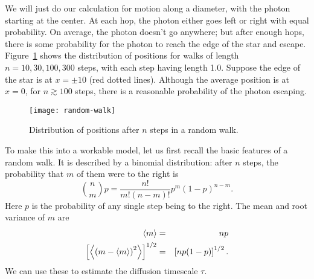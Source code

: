 We will just do our calculation for motion along a diameter, with the photon starting at the center. At each hop, the photon either goes left or right with equal probability. On average, the photon doesn't go anywhere; but after enough hops, there is some probability for the photon to reach the edge of the star and escape. Figure~\ref{f.random-walk} shows the distribution of positions for walks of length $n = 10, 30, 100, 300$ steps, with each step having length 1.0. Suppose the edge of the star is at $x=\pm 10$ (red dotted lines).  Although the average position is at $x=0$, for $n \gtrsim 100$ steps, there is a reasonable probability of the photon escaping.
\begin{figure}[htbp]
\forceversofloat
\texttt{[image: random-walk]}
\caption[Distribution of positions in a random walk]{\label{f.random-walk} Distribution of positions after $n$ steps in a random walk.}
\end{figure}

To make this into a workable model, let us first recall the basic features of a random walk. It is described by a binomial distribution: after $n$ steps, the probability that $m$ of them were to the right is
\begin{equation}\label{e.binomial}
    \binom{n}{m}{p} = \frac{n!}{m!(n-m)!} p^{m}(1-p)^{n-m}.
\end{equation}
Here $p$ is the probability of any single step being to the right.
The mean and root variance of $m$ are
\begin{eqnarray}
	\left\langle m\right\rangle &=& np \label{e.mean-binomial} \\
	\left[\left\langle\left(m-\left\langle m\right\rangle\right)^{2}\right\rangle\right]^{1/2} &=& \left[np(1-p)\right]^{1/2}. \label{e.var-binomial}
\end{eqnarray}
We can use these to estimate the diffusion timescale $\tau$.

